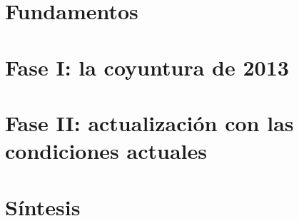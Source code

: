 \documentclass[12pt,oneside]{report}
\begin{document}
\onehalfspacing




\tableofcontents
\listoffigures
\listoftables
\cleardoublepage
{}

\part{Fundamentos}







\part{Fase I: la coyuntura de 2013}



\part{Fase II: actualización con las condiciones actuales}



\part{Síntesis}




\appendix





\end{document}
